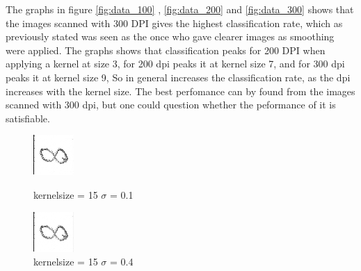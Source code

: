 The graphs in figure \ref{fig:data_100} , \ref{fig:data_200}  and \ref{fig:data_300}   shows that the images scanned with 300 DPI gives the highest classification rate, which as previously stated was seen as the once who gave clearer images as smoothing were applied.  The graphs shows that classification peaks for 200 DPI when applying a kernel at size 3, for 200 dpi peaks it at kernel size 7, and for 300 dpi peaks it at kernel size 9, So in general increases the classification rate, as the dpi increases with the kernel size. The best perfomance can by found from the images scanned with 300 dpi, but one could question whether the peformance of it is satisfiable. 

\begin{figure}[H]    
	\begin{minipage}[t]{0.30\textwidth}
		\centering
			\includegraphics[width=0.4\linewidth]{figure/mikael_8_2_dpi300_k15_sig_01.png}
			\caption{kernelsize = 15 $\sigma$ = 0.1}
			\label{fig:dpi_300_k_9_s_0.1}
	\end{minipage}
	\hspace{\fill}	
	\begin{minipage}[t]{0.30\textwidth}
		\centering
			\includegraphics[width=0.4\linewidth]{figure/mikael_8_2_dpi300_k15_sig_04.png}
			\caption{kernelsize = 15 $\sigma$ = 0.4}
			\label{fig:dpi_300_k_9_s_0.4}
	\end{minipage}
	\hspace{\fill}
	\begin{minipage}[t]{0.30\textwidth}

\end{minipage}
\end{figure}
